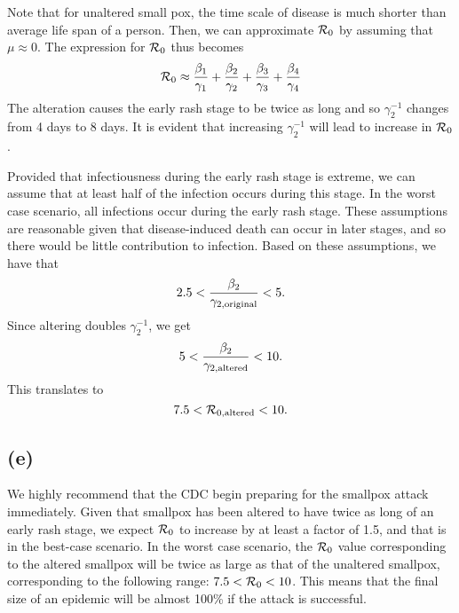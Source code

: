 \documentclass{article}
\begin{document}
Note that for unaltered small pox, the time scale of disease is much shorter than average life span of a person. Then, we can approximate ${\cal R}_0$ by assuming that $\mu \approx 0$. The expression for ${\cal R}_0$ thus becomes
$$
{\cal R}_0 \approx \frac{\beta_1}{\gamma_1} + \frac{\beta_2}{\gamma_2} + \frac{\beta_3}{\gamma_3} + \frac{\beta_4}{\gamma_4}
$$
The alteration causes the early rash stage to be twice as long and so $\gamma_2^{-1}$ changes from 4 days to 8 days.
It is evident that increasing $\gamma_2^{-1}$ will lead to increase in ${\cal R}_0$.

Provided that infectiousness during the early rash stage is extreme, we can assume that at least half of the infection occurs during this stage. In the worst case scenario, all infections occur during the early rash stage. These assumptions are reasonable given that disease-induced death can occur in later stages, and so there would be little contribution to infection.
Based on these assumptions, we have that
$$
2.5 < \frac{\beta_2}{\gamma_{2,\tiny{\textrm{original}}}} < 5.
$$
Since altering doubles $\gamma_2^{-1}$, we get
$$
5 < \frac{\beta_2}{\gamma_{2,\tiny{\textrm{altered}}}} < 10.
$$
This translates to
$$
7.5 < {\cal R}_{0, \tiny{\textrm{altered}}} <10.
$$

\subsection*{(e)}

We highly recommend that the CDC begin preparing for the smallpox attack immediately. Given that smallpox has been altered to have twice as long of an early rash stage, we expect ${\cal R}_0$ to increase by at least a factor of 1.5, and that is in the best-case scenario. In the worst case scenario, the ${\cal R}_0$ value corresponding to the altered smallpox will be twice as large as that of the unaltered smallpox, corresponding to the following range: $7.5 < {\cal R}_0 < 10$.
This means that the final size of an epidemic will be almost 100\% if the attack is successful.
\end{document}
